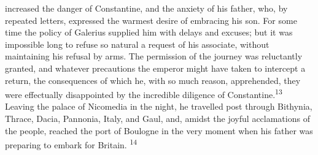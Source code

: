 increased the danger of Constantine, and the anxiety of his
father, who, by repeated letters, expressed the warmest desire of
embracing his son. For some time the policy of Galerius supplied
him with delays and excuses; but it was impossible long to refuse
so natural a request of his associate, without maintaining his
refusal by arms. The permission of the journey was reluctantly
granted, and whatever precautions the emperor might have taken to
intercept a return, the consequences of which he, with so much
reason, apprehended, they were effectually disappointed by the
incredible diligence of Constantine.\textsuperscript{13} Leaving the palace of
Nicomedia in the night, he travelled post through Bithynia,
Thrace, Dacia, Pannonia, Italy, and Gaul, and, amidst the joyful
acclamations of the people, reached the port of Boulogne in the
very moment when his father was preparing to embark for Britain. \textsuperscript{14}



